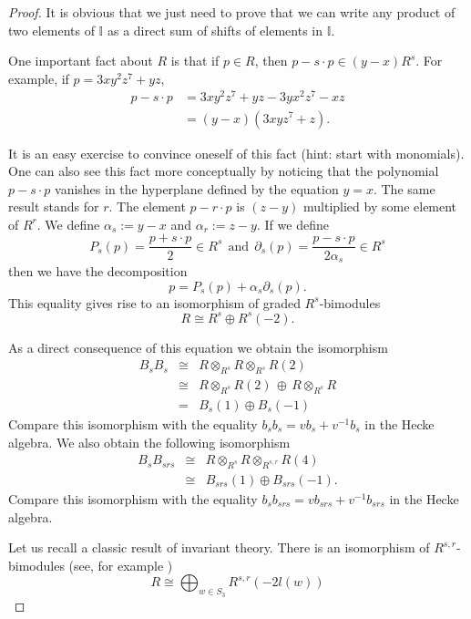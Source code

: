\documentclass[12pt]{wart}
\theoremstyle{remark}
\def\II{\mathbb I}\def\JJ{\mathbb J}\def\KK{\mathbb K}\def\LL{\mathbb L}
\def\del{\partial}
\begin{document}
\begin{proof}
It is obvious that we just need to prove that we can write any product of two elements of $\II$ as a direct sum of shifts of elements in $\II.$


One important fact about $R$ is that if $p\in R$, then $p-s\cdot p \in (y-x)R^s.$  For example, if $p=3xy^2z^7+ yz$, 
 \begin{align*}
p-s\cdot p &=3xy^2z^7+ yz -3yx^2z^7- xz \\
&= (y-x)(3xyz^7+z).
\end{align*}
 
 It is an easy exercise to convince oneself of this fact (hint: start with monomials). One can also see this fact more conceptually by noticing that the polynomial $p-s\cdot p$ vanishes in the hyperplane defined by the equation $y=x$. 
The same result stands for $r$. The element $p-r\cdot p$ is  $(z-y)$ multiplied by some element of $R^r.$ We define $\alpha_s:=y-x$ and $\alpha_r:=z-y$. If we define $$P_s(p)=\frac{p+s\cdot p}{2} \in R^s \  \ \mathrm{ and  } \ \  \del_s(p)=\frac{p-s\cdot p}{2\alpha_s} \in R^s$$
 then we have the decomposition \begin{equation}\label{p}p=P_s(p)+\alpha_s\del_s(p).\end{equation} This equality gives rise to an isomorphism of graded  $R^s$-bimodules
 \begin{equation}\label{Rgr}
 R\cong R^s\oplus R^s(-2).
 \end{equation}




As a direct consequence of this equation we obtain the isomorphism
\begin{eqnarray}\label{BsBs}
B_sB_s &\cong& R\otimes_{R^s}R\otimes_{R^s}R(2) \nonumber\\
&\cong&  R\otimes_{R^s}R(2)\,  \oplus \,  R\otimes_{R^s}R \nonumber\\
&=& B_s(1)\oplus B_s(-1)
\end{eqnarray}
Compare this isomorphism with the equality $b_sb_s=vb_s+v^{-1}b_s$ in the Hecke algebra. 
We also obtain the following isomorphism
\begin{eqnarray}\label{BsBsrs}
B_sB_{srs} &\cong& R\otimes_{R^s}R\otimes_{R^{s,r}}R(4) \nonumber\\
&\cong&  B_{srs}(1) \oplus  B_{srs}(-1).
\end{eqnarray}
Compare this isomorphism with the equality $b_sb_{srs}=vb_{srs}+v^{-1}b_{srs}$ in the Hecke algebra. 

Let us recall a classic result of invariant theory. There is an isomorphism of $R^{s,r}$-bimodules (see, for example  \cite[ch. IV, cor. 1.11 a.]{Hi})
\begin{equation}\label{sr} R\cong \bigoplus_{w\in S_3}R^{s,r}(-2l(w))\end{equation}


\end{proof}
\end{document}
